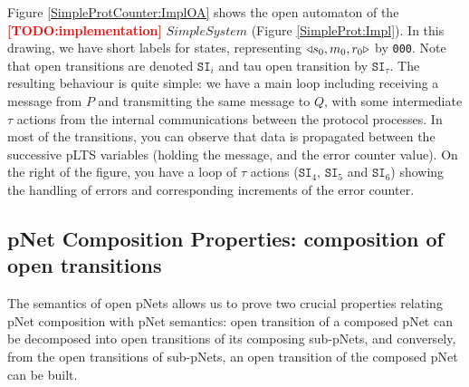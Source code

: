 \documentclass{lmcs}
\newcommand{\TODO}[1]{\textcolor{red}{\textbf{[TODO:#1]}}}
\begin{document}
    Figure \ref{SimpleProtCounter:ImplOA} shows the open automaton of the \TODO{implementation} $SimpleSystem$ (Figure \ref{SimpleProt:Impl}). In this drawing, we have short labels for states, representing $\triangleleft{s_0,m_0,r_0}\triangleright$ by \texttt{000}. Note that open transitions are denoted $\texttt{SI}_i$ and tau open transition by  $\texttt{SI}_{\tau}$. The resulting behaviour is quite simple:  we have a main loop including receiving a message from $P$ and transmitting the same message to $Q$, with some intermediate $\tau$ actions from the internal communications between the protocol processes. In most of the transitions, you can observe that data is propagated between the successive pLTS variables (holding the message, and the error counter value). On the right of the figure, you have a loop of $\tau$ actions ($\texttt{SI}_4$, $\texttt{SI}_5$ and $\texttt{SI}_6$)  showing the handling of errors and corresponding increments of the error counter.
    
    
  

\subsection{pNet Composition Properties: composition of open transitions}
The semantics of open pNets allows us to prove two crucial properties relating pNet composition with pNet semantics: open transition of a composed pNet can be decomposed into open transitions of its composing sub-pNets, and conversely, from the open transitions of sub-pNets,  an open transition of the composed pNet can be built.
\end{document}
